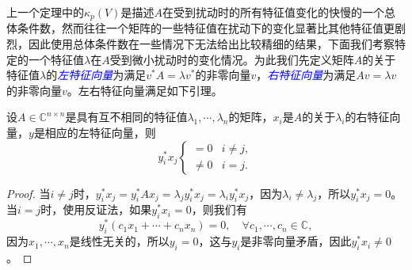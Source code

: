 \documentclass[a4paper,10pt]{ctexart}
\begin{document}
上一个定理中的$ \kappa_p(V) $是描述$ A $在受到扰动时的所有特征值变化的快慢的一个总体条件数，然而往往一个矩阵的一些特征值在扰动下的变化显著比其他特征值更剧烈，因此使用总体条件数在一些情况下无法给出比较精细的结果，下面我们考察特定的一个特征值$ \lambda $在$ A $受到微小扰动时的变化情况。为此我们先定义矩阵$ A $的关于特征值$ \lambda $的\textcolor{blue}{\emph{左特征向量}}为满足$ v^*A = \lambda v^* $的非零向量$ v $，\textcolor{blue}{\emph{右特征向量}}为满足$ Av = \lambda v $的非零向量$ v $。左右特征向量满足如下引理。
\begin{lemma}
    设$ A\in \mathbb{C}^{n\times n} $是具有互不相同的特征值$ \lambda_1,\cdots ,\lambda_n $的矩阵，$ x_i $是$ A $的关于$ \lambda_i $的右特征向量，$ y $是相应的左特征向量，则
    \begin{equation}
        y^*_i x_j
        \begin{cases}
            =0 & i\ne j,\\
            \ne 0 & i = j.
        \end{cases}
    \end{equation}
\end{lemma}
\begin{proof}
    当$ i\ne j $时，$ y^*_i x_j = y^*_i Ax_j = \lambda_j y^*_i x_j = \lambda_i y_i^* x_j $，因为$ \lambda_i\ne \lambda_j $，所以$ y_i^* x_j=0 $。当$ i = j $时，使用反证法，如果$ y_i^* x_i = 0 $，则我们有
    \[
        y_i^* (c_1 x_1 + \cdots + c_n x_n) = 0,\quad \forall c_1,\cdots ,c_n\in \mathbb{C},
    \]
    因为$ x_1,\cdots ,x_n $是线性无关的，所以$ y_i = 0 $，这与$ y_i $是非零向量矛盾，因此$ y_i^* x_i \ne 0 $。
\end{proof}
\end{document}
